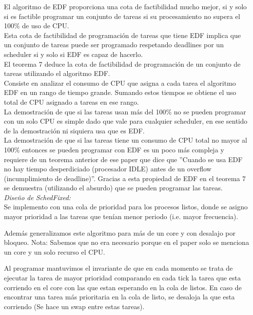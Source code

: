 El algoritmo de EDF proporciona una cota de factibilidad mucho mejor, si y solo si es factible programar un conjunto de tareas si su procesamiento no supera el 100\% de uso de CPU.\\


Esta cota de factibilidad de programación de tareas que tiene EDF implica que un conjunto de tareas puede ser programado respetando deadlines por un scheduler si y solo si EDF es capaz de hacerlo.\\


El teorema 7 deduce la cota de factibilidad de programación de un conjunto de tareas utilizando el algoritmo EDF.\\

Consiste en analizar el consumo de CPU que asigna a cada tarea el algoritmo EDF en un rango de tiempo grande. Sumando estos tiempos se obtiene el uso total de CPU asignado a tareas en ese rango. \\

La demostración de que si las tareas usan más del 100\% no se pueden programar con un solo CPU es simple dado que vale para cualquier scheduler, en ese sentido de la demostración ni siquiera usa que es EDF. \\

La demostración de que si las tareas tiene un consumo de CPU total no mayor al 100\% entonces se pueden programar con EDF es un poco más compleja y requiere de un teorema anterior de ese paper que dice que ''Cuando se usa EDF no hay tiempo desperdiciado (procesador IDLE) antes de un overflow (incumplimiento de deadline)''. Gracias a esta propiedad de EDF en el teorema 7 se demuestra (utilizando el absurdo) que se pueden programar las tareas.\\



\noindent
\emph{Diseño de SchedFixed:} \\

Se implemento con una cola de prioridad para los procesos listos, donde se asigno mayor prioridad a las tareas que tenían menor periodo (i.e. mayor frecuencia). 

Además generalizamos este algoritmo para más de un core y con desalajo por bloqueo.
Nota: Sabemos que no era necesario porque en el paper solo se menciona un core y un solo recurso el CPU.

Al programar mantuvimos el invariante de que en cada momento se trata de ejecutar la tarea de mayor prioridad comparando en cada tick la tarea que esta corriendo en el core con las que estan esperando en la cola de listos. En caso de encontrar una tarea más prioritaria en la cola de listo, se desaloja la que esta corriendo (Se hace un swap entre estas tareas).\\


